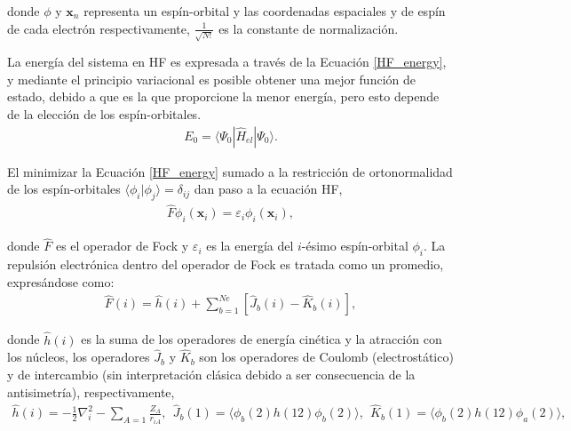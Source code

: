 \noindent donde $\phi$ y $\mathbf{x}_n$ representa un espín-orbital y las
coordenadas espaciales y de espín de cada electrón respectivamente,
$\frac{1}{\sqrt{N!}}$ es la constante de normalización.

La energía del sistema en HF es expresada a través de la Ecuación
\ref{HF_energy}, y mediante el principio variacional es posible obtener una
mejor función de estado, debido a que es la que proporcione la menor energía,
pero esto depende de la elección de los espín-orbitales.
%
\begin{align}
  E_0 = \langle \Psi_0 | \widehat{H}_{el} | \Psi_0 \rangle .
\label{HF_energy}
\end{align}

El minimizar la Ecuación \ref{HF_energy} sumado a la restricción de
ortonormalidad de los espín-orbitales $\langle\phi_{i}|\phi_{j}\rangle =
\delta_{ij}$ dan paso a la ecuación HF,
\begin{align}
  \widehat{F}\phi_{i}(\mathbf{x}_i)=\varepsilon_{i}\phi_{i}(\mathbf{x}_i),
\end{align}

\noindent donde $\widehat{F}$ es el operador de Fock y $\varepsilon_i$ es la
energía del $i$-ésimo espín-orbital $\phi_i$. La repulsión electrónica dentro
del operador de Fock es tratada como un promedio, expresándose como:
%
\begin{align} %
  \widehat{F} (i) = \widehat{h}(i) + \sum_{b=1}^{Ne} [\hat{J}_b (i) - \hat{K}_b (i)],
\end{align}

\noindent donde $\widehat{h}(i)$ es la suma de los operadores de energía
cinética y la atracción con los núcleos, los operadores $\hat{J}_b$ y
$\hat{K}_b$ son los operadores de Coulomb (electrostático) y de intercambio
(sin interpretación clásica debido a ser consecuencia de la antisimetría),
respectivamente, 
%
\begin{align}
  \widehat{h}(i) = -\frac{1}{2}\nabla^{2}_{i} -\sum_{A=1}\frac{Z_{A}}{r_{iA}}, \ \ 
  \hat{J}_b (1) = \langle\phi_{b}(2) h(12) \phi_{b}(2)\rangle , \ \ 
  \hat{K}_b (1) =\langle\phi_{b}(2) h(12) \phi_{a}(2)\rangle ,
\end{align}

